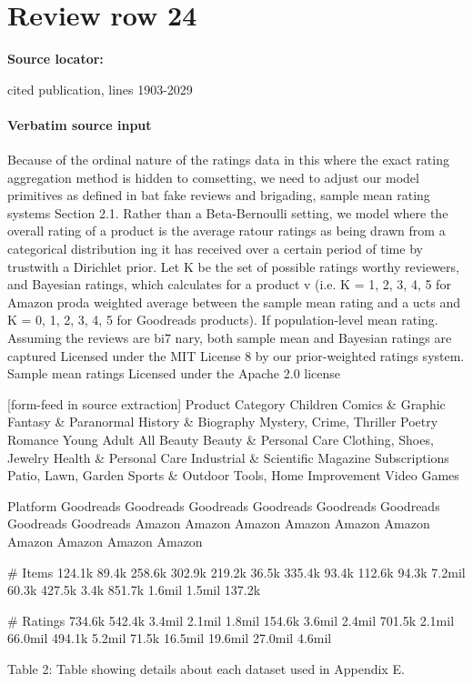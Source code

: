 \documentclass[10pt]{article}
\begin{document}
\section*{Review row 24}
\textbf{Source locator:} {\footnotesize\raggedright cited publication, lines 1903-\allowbreak{}2029\par}
\paragraph{Verbatim source input}
\begin{ReviewVerbatim}
Because of the ordinal nature of the ratings data in this
where the exact rating aggregation method is hidden to comsetting, we need to adjust our model primitives as defined in
bat fake reviews and brigading, sample mean rating systems
Section 2.1. Rather than a Beta-Bernoulli setting, we model
where the overall rating of a product is the average ratour ratings as being drawn from a categorical distribution
ing it has received over a certain period of time by trustwith a Dirichlet prior. Let K be the set of possible ratings
worthy reviewers, and Bayesian ratings, which calculates
for a product v (i.e. K = {1, 2, 3, 4, 5} for Amazon proda weighted average between the sample mean rating and a
ucts and K = {0, 1, 2, 3, 4, 5} for Goodreads products). If
population-level mean rating. Assuming the reviews are bi7
nary, both sample mean and Bayesian ratings are captured
Licensed under the MIT License
8
by our prior-weighted ratings system. Sample mean ratings
Licensed under the Apache 2.0 license


[form-feed in source extraction]
Product Category
Children
Comics & Graphic
Fantasy & Paranormal
History & Biography
Mystery, Crime, Thriller
Poetry
Romance
Young Adult
All Beauty
Beauty & Personal Care
Clothing, Shoes, Jewelry
Health & Personal Care
Industrial & Scientific
Magazine Subscriptions
Patio, Lawn, Garden
Sports & Outdoor
Tools, Home Improvement
Video Games

Platform
Goodreads
Goodreads
Goodreads
Goodreads
Goodreads
Goodreads
Goodreads
Goodreads
Amazon
Amazon
Amazon
Amazon
Amazon
Amazon
Amazon
Amazon
Amazon
Amazon

# Items
124.1k
89.4k
258.6k
302.9k
219.2k
36.5k
335.4k
93.4k
112.6k
94.3k
7.2mil
60.3k
427.5k
3.4k
851.7k
1.6mil
1.5mil
137.2k

# Ratings
734.6k
542.4k
3.4mil
2.1mil
1.8mil
154.6k
3.6mil
2.4mil
701.5k
2.1mil
66.0mil
494.1k
5.2mil
71.5k
16.5mil
19.6mil
27.0mil
4.6mil

Table 2: Table showing details about each dataset used in
Appendix E.


\end{ReviewVerbatim}
\end{document}
